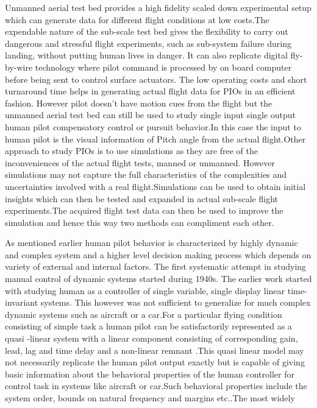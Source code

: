 \par Unmanned aerial test bed provides a high fidelity scaled down experimental setup which can generate data for different flight conditions at low costs.The expendable nature of the sub-scale test bed gives the flexibility to carry out dangerous and stressful flight experiments, such as sub-system failure during landing, without putting human lives in danger. It can also replicate digital fly-by-wire technology where pilot command is processed by on board computer before being sent to control surface actuators. The low operating costs and short turnaround time helps in generating actual flight data for PIOs in an efficient fashion\cite{mandal2013flight}. However pilot doesn't have motion cues from the flight but the unmanned aerial test bed can still be used to study single input single output human pilot compensatory control or pursuit behavior.In this case the input to human pilot is the visual information of Pitch angle from the actual flight.Other approach to study PIOs is to use simulations\cite{McRuerPIO} as they are free of the inconveniences of the actual flight tests, manned or unmanned. However simulations may not capture the full characteristics of the complexities and uncertainties involved with a real flight\cite{mcruer1997aviation}.Simulations can be used to obtain initial insights which can then be tested and expanded in actual sub-scale flight experiments.The acquired flight test data can then be used to improve the simulation and hence this way two methods can compliment each other.
\par As mentioned earlier human pilot behavior is characterized by highly dynamic and complex system and a higher level decision making process which depends on variety of external and internal factors\cite{stapleford1969experiments}\cite{kleinman1971control}\cite{johannsen1994theoretical}. The first systematic attempt in studying manual control of dynamic systems started during 1940s. The earlier work started with studying human as a controller of single variable, single display linear time-invariant systems. This however was not sufficient to generalize for much complex dynamic systems such as aircraft or a car\cite{land1994we}\cite{sentouh2009sensorimotor}.For  a  particular  flying 
condition consisting of simple task a human pilot can be satisfactorily represented as a quasi -linear system with a linear component consisting of corresponding gain, lead, lag and time delay and a non-linear remnant \cite{hess1990control}.This quasi linear model may not necessarily replicate the human pilot output exactly but is capable  of giving basic information about the behavioral properties of the human controller for control task in  systems like aircraft or car\cite{mcruer1967review}.Such behavioral properties include the system order, bounds on natural frequency and margins etc.\cite{shappell2012human}\cite{mcruer1969theory}\cite{hosman1999pilot}\cite{kleinman1971control}.The most widely 
